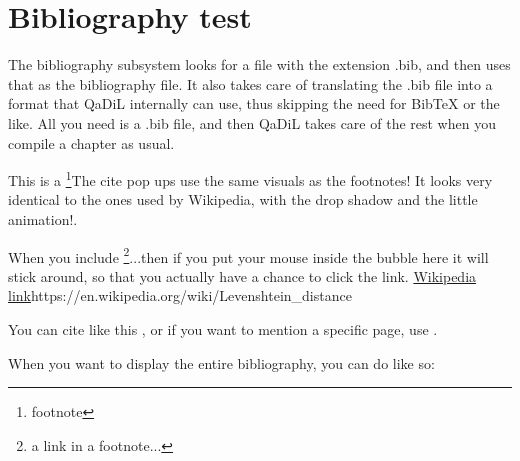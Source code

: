 \documentclass{article}
\begin{document}

\chapter{Bibliography test}

The bibliography subsystem looks for a file with the extension .bib, and then uses that as the bibliography file. It also takes care of translating the .bib file into a format that QaDiL internally can use, thus skipping the need for BibTeX or the like. All you need is a .bib file, and then QaDiL takes care of the rest when you compile a chapter as usual.

This is a \footnote{footnote}{The cite pop ups use the same visuals as the footnotes! It looks very identical to the ones used by Wikipedia, with the drop shadow and the little animation!}.

When you include \footnote{a link in a footnote...}{...then if you put your mouse inside the bubble here it will stick around, so that you actually have a chance to click the link. \url{Wikipedia link}{https://en.wikipedia.org/wiki/Levenshtein_distance}}

You can cite like this \cite{matsumoto}, or if you want to mention a specific page, use \cite[p. 42]{matsumoto}.

When you want to display the entire bibliography, you can do like so:


\end{document}
